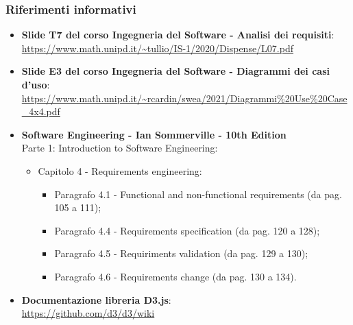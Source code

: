 \subsubsection{Riferimenti informativi}
\begin{itemize}
	\item \textbf{Slide T7 del corso Ingegneria del Software - Analisi dei requisiti}:\\
	\textcolor{blue}{\url{https://www.math.unipd.it/~tullio/IS-1/2020/Dispense/L07.pdf}}
	\item \textbf{Slide E3 del corso Ingegneria del Software - Diagrammi dei casi d'uso}:\\
	\textcolor{blue}{\url{https://www.math.unipd.it/~rcardin/swea/2021/Diagrammi\%20Use\%20Case_4x4.pdf}}

\item \textbf{Software Engineering - Ian Sommerville - 10th Edition}\\ Parte 1: Introduction to Software Engineering:
	\begin{itemize}
	\item Capitolo 4 - Requirements engineering:
		\begin{itemize}
			\item Paragrafo 4.1 - Functional and non-functional requirements (da pag. 105 a 111);
			\item Paragrafo 4.4 - Requirements specification (da pag. 120 a 128);
			\item Paragrafo 4.5 - Requiriments validation (da pag. 129 a 130);
			\item Paragrafo 4.6 - Requirements change (da pag. 130 a 134).
		\end{itemize}
	\end{itemize}
	\item \textbf{Documentazione libreria D3.js}: \\
	\textcolor{blue}{\url{https://github.com/d3/d3/wiki}}

\end{itemize}
	
	

